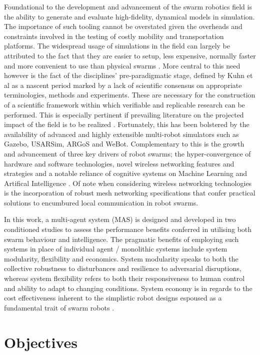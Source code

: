 \documentclass{report}
\begin{document}
Foundational to the development and advancement of the swarm robotics field is the ability to generate and evaluate high-fidelity, dynamical models in simulation. The importance of such tooling cannot be overstated given the overheads and constraints involved in the testing of costly mobility and transportation platforms. The widespread usage of simulations in the field can largely be attributed to the fact that they are easier to setup, less expensive, normally faster and more convenient to use than physical swarms \cite{WeBot2004}. More central to this need however is the fact of the disciplines' pre-paradigmatic stage, defined by Kuhn et al \cite{Kuhn2015} as a nascent period marked by a lack of scientific consensus on appropriate terminologies, methods and experiments. These are necessary for the construction of a scientific framework within which verifiable and replicable research can be performed. This is especially pertinent if prevailing literature on the projected impact of the field is to be realized \cite{Yang2018}. Fortunately, this has been bolstered by the availability of advanced and highly extensible multi-robot simulators such as Gazebo, USARSim, ARGoS \cite{Pinciroli2014} and WeBot. Complementary to this is the growth and advancement of three key drivers of robot swarms; the hyper-convergence of hardware and software technologies, novel wireless networking features and strategies and a notable reliance of cognitive systems on Machine Learning and Artifical Intelligence \cite{Yang2018}. Of note when considering wireless networking technologies is the incorporation of robust mesh networking specifications \cite{Blue2018} that confer practical solutions to encumbured local communication in robot swarms.

In this work, a multi-agent system (MAS) is designed and developed in two conditioned studies to assess the performance benefits conferred in utilising both swarm behaviour and intelligence. The pragmatic benefits of employing such systems in place of individual agent / monolithic systems include system modularity, flexibility and economics. System modularity speaks to both the collective robustness to disturbances and resilience to adversarial disruptions, whereas system flexibility refers to both their responsiveness to human control and ability to adapt to changing conditions. System economy is in regards to the cost effectiveness inherent to the simplistic robot designs espoused as a fundamental trait of swarm robots \cite{Yang2018}.

\section{Objectives}
\end{document}
